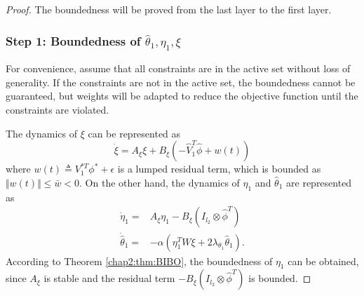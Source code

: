 \begin{proof}

The boundedness will be proved from the last layer to the first layer.

\subsubsection{Step 1: Boundedness of $\hat\theta_1,\eta_1,\xi$}

For convenience, assume that all constraints are in the active set without loss of generality.
If the constraints are not in the active set, the boundedness cannot be guaranteed, but weights will be adapted to reduce the objective function until the constraints are violated.

The dynamics of $\xi$ can be represented as
\begin{equation}    
    \dot \xi = A_\xi\xi +B_\xi
    (
        -\hat V_1^T \hat\phi+w(t)
    )
\end{equation}
where $w(t)\triangleq V_1^{*T}\phi^*+\epsilon$ is a lumped residual term, which is bounded as $\Vert w(t)\Vert\le \bar w< 0$.
On the other hand, the dynamics of $\eta_1$ and $\hat\theta_1$ are represented as
\begin{equation}
    \begin{aligned}
        \dot\eta_1 =
        & 
        A_\xi \eta_1 -B_\xi (I_{l_{2}}\otimes \hat\phi^T)
        \\
        \dot{\hat\theta}_1 =
        & -\alpha 
        (
            \eta_1^TW\xi+2\lambda_{\theta_1} \hat\theta_1
        ).
    \end{aligned} 
\end{equation}
According to Theorem \ref{chap2:thm:BIBO}, the boundedness of $\eta_1$ can be obtained, since $A_\xi$ is stable and the residual term $-B_\xi (I_{l_{2}}\otimes \hat\phi^T)$ is bounded.


\end{proof}
